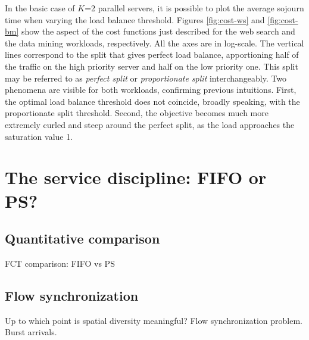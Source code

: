 In the basic case of $K$=2 parallel servers, it is possible to plot the average sojourn time when varying the load balance threshold. Figures \ref{fig:cost-ws} and \ref{fig:cost-bm} show the aspect of the cost functions just described for the web search and the data mining workloads, respectively. All the axes are in log-scale. The vertical lines correspond to the split that gives perfect load balance, apportioning half of the traffic on the high priority server and half on the low priority one. This split may be referred to as \emph{perfect split} or \emph{proportionate split} interchangeably. Two phenomena are visible for both workloads, confirming previous intuitions. First, the optimal load balance threshold does not coincide, broadly speaking, with the proportionate split threshold. Second, the objective becomes much more extremely curled and steep around the perfect split, as the load approaches the saturation value 1. 
\section{The service discipline: FIFO or PS?}

\subsection{Quantitative comparison}
FCT comparison: FIFO vs PS
\subsection{Flow synchronization}
Up to which point is spatial diversity meaningful? Flow synchronization problem. Burst arrivals. 
